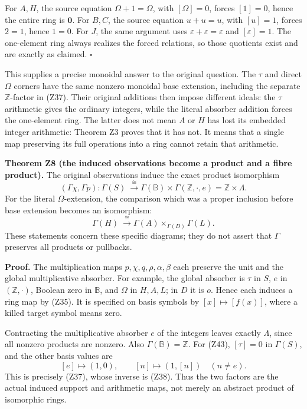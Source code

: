 \documentclass[
]{article}
\begin{document}
For \(A,H\), the source equation \(\Omega+1=\Omega\), with
\([\Omega]=0\), forces \([1]=0\), hence the entire ring is \(\mathbf0\).
For \(B,C\), the source equation \(u+u=u\), with \([u]=1\), forces
\(2=1\), hence \(1=0\). For \(J\), the same argument uses
\(\varepsilon+\varepsilon=\varepsilon\) and \([\varepsilon]=1\). The
one-element ring always realizes the forced relations, so those
quotients exist and are exactly as claimed. \(\square\)

This supplies a precise monoidal answer to the original question. The
\(\tau\) and direct \(\Omega\) corners have the same nonzero monoidal
base extension, including the separate \(\mathbb Z\)-factor in (Z37).
Their original additions then impose different ideals: the \(\tau\)
arithmetic gives the ordinary integers, while the literal absorber
addition forces the one-element ring. The latter does not mean \(A\) or
\(H\) has lost its embedded integer arithmetic: Theorem Z3 proves that
it has not. It means that a single map preserving its full operations
into a ring cannot retain that arithmetic.

\textbf{Theorem Z8 (the induced observations become a product and a
fibre product).} The original observations induce the exact product
isomorphism \[
(\Gamma\chi,\Gamma p):
\Gamma(S)\ \xrightarrow{\ \cong\ }
\Gamma(\mathbb B)\times\Gamma(\mathbb Z,\cdot,e)
=\mathbb Z\times\Lambda.
\tag{Z43}
\] For the literal \(\Omega\)-extension, the comparison which was a
proper inclusion before base extension becomes an isomorphism: \[
\Gamma(H)\ \xrightarrow{\ \cong\ }
\Gamma(A)\times_{\Gamma(D)}\Gamma(L).
\tag{Z44}
\] These statements concern these specific diagrams; they do not assert
that \(\Gamma\) preserves all products or pullbacks.

\textbf{Proof.} The multiplication maps \(p,\chi,q,\rho,\alpha,\beta\)
each preserve the unit and the global multiplicative absorber. For
example, the global absorber is \(\tau\) in \(S\), \(e\) in
\((\mathbb Z,\cdot)\), Boolean zero in \(\mathbb B\), and \(\Omega\) in
\(H,A,L\); in \(D\) it is \(o\). Hence each induces a ring map by (Z35).
It is specified on basis symbols by \([x]\mapsto[f(x)]\), where a killed
target symbol means zero.

Contracting the multiplicative absorber \(e\) of the integers leaves
exactly \(\Lambda\), since all nonzero products are nonzero. Also
\(\Gamma(\mathbb B)=\mathbb Z\). For (Z43), \([\tau]=0\) in
\(\Gamma(S)\), and the other basis values are \[
[e]\mapsto(1,0),\qquad
[n]\mapsto(1,[n])\quad(n\ne e).
\] This is precisely (Z37), whose inverse is (Z38). Thus the two factors
are the actual induced support and arithmetic maps, not merely an
abstract product of isomorphic rings.
\end{document}

